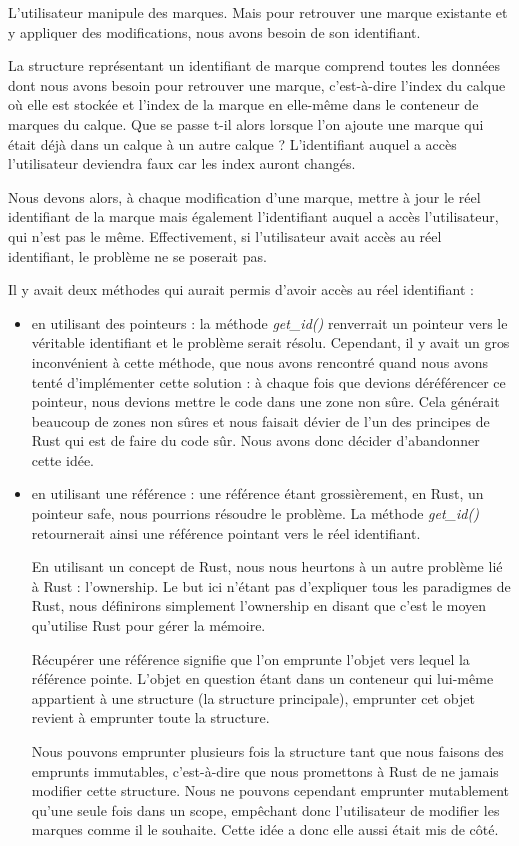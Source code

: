 \documentclass[12pt]{article}
\begin{document}
L'utilisateur manipule des marques. Mais pour retrouver une marque existante et y
appliquer des modifications, nous avons besoin de son identifiant.

La structure représentant un identifiant de marque comprend toutes les données dont nous
avons besoin pour retrouver une marque, c'est-à-dire l'index du calque où elle est
stockée et l'index de la marque en elle-même dans le conteneur de marques du calque.
Que se passe t-il alors lorsque l'on ajoute une marque qui était déjà dans un calque à
un autre calque ? L'identifiant auquel a accès l'utilisateur deviendra faux car les index
auront changés.

Nous devons alors, à chaque modification d'une marque, mettre à jour le réel
identifiant de la marque mais également l'identifiant auquel a accès l'utilisateur, qui n'est pas le même.
Effectivement, si l'utilisateur avait accès au réel identifiant, le problème ne se
poserait pas.

Il y avait deux méthodes qui aurait permis d'avoir accès au réel identifiant :
\begin{itemize}
\item en utilisant des pointeurs : la méthode \textit{get\_id()} renverrait un pointeur
vers le véritable identifiant et le problème serait résolu. Cependant, il y avait un gros
inconvénient à cette méthode, que nous avons rencontré quand nous avons tenté
d'implémenter cette solution : à chaque fois que devions déréférencer ce pointeur, nous
devions mettre le code dans une zone non sûre. Cela générait beaucoup de zones non sûres
et nous faisait dévier de l'un des principes de Rust qui est de faire du code sûr. Nous
avons donc décider d'abandonner
cette idée.
\item en utilisant une référence : une référence étant grossièrement, en Rust, un
pointeur safe, nous pourrions résoudre le problème. La méthode \textit{get\_id()}
retournerait ainsi une référence pointant vers le réel identifiant.

En utilisant un concept de Rust, nous nous heurtons à un autre problème lié à Rust :
l'ownership. Le but ici n'étant pas d'expliquer tous les paradigmes de Rust, nous
définirons simplement l'ownership en disant que c'est le moyen qu'utilise Rust pour gérer la mémoire.

Récupérer une référence signifie que l'on emprunte l'objet vers lequel la référence
pointe. L'objet en question étant dans un conteneur qui lui-même appartient à une
structure (la structure principale), emprunter cet objet revient à emprunter toute la
structure.

Nous pouvons emprunter plusieurs fois la structure tant que nous faisons des
emprunts immutables, c'est-à-dire que nous promettons à Rust de ne jamais modifier cette
structure. Nous ne pouvons cependant emprunter mutablement qu'une seule fois dans un scope, empêchant donc l'utilisateur de modifier les marques comme il le souhaite.
Cette idée a donc elle aussi était mis de côté.
\end{itemize}
\end{document}
